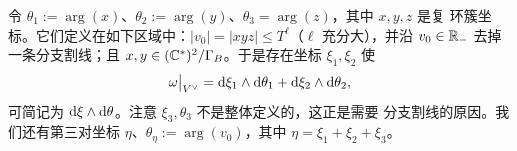 \begin{claim}[作用--角坐标的定义]\label{clm:4-1-16}
令 $\theta_1:=\arg(x)$、$\theta_2:=\arg(y)$、$\theta_3=\arg(z)$，其中 $x,y,z$ 是复
环簇坐标。它们定义在如下区域中：$|v_0|=|xyz|\le T^\ell$（$\ell$ 充分大），并沿
$v_0\in\mathbb{R}_-$ 去掉一条分支割线；且 $x,y\in(\mathbb{C}^*)^2/\Gamma_B$。于是存在坐标
$\xi_1,\xi_2$ 使
\[
{\omega}\big|_{V^{\vee}}=\mathrm{d}\xi_1\wedge\mathrm{d}\theta_1+\mathrm{d}\xi_2\wedge\mathrm{d}\theta_2,
\]
可简记为 $\mathrm{d}\xi\wedge\mathrm{d}\theta$。注意 $\xi_3,\theta_3$ 不是整体定义的，这正是需要
分支割线的原因。我们还有第三对坐标 $\eta$、$\theta_\eta:=\arg(v_0)$，其中
$\eta=\xi_1+\xi_2+\xi_3$。
\end{claim}


